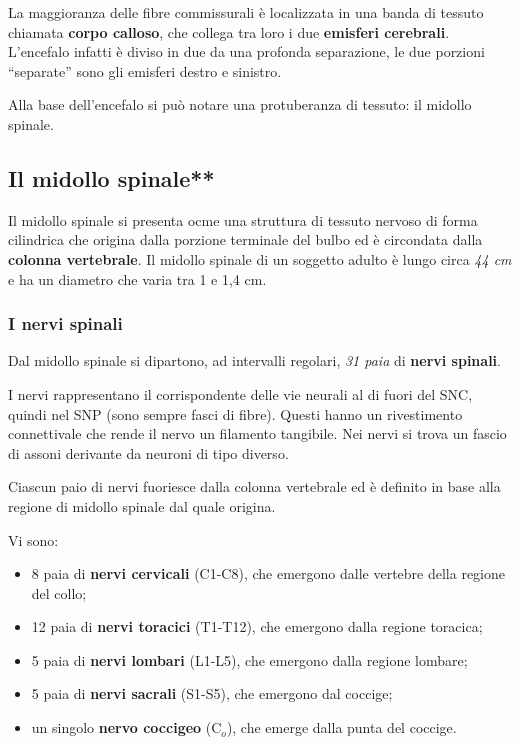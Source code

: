 \documentclass[]{article}
\begin{document}
La maggioranza delle fibre commissurali è localizzata in una banda di
tessuto chiamata \textbf{corpo calloso}, che collega tra loro i due
\textbf{emisferi cerebrali}. L'encefalo infatti è diviso in due da una
profonda separazione, le due porzioni ``separate'' sono gli emisferi
destro e sinistro.

Alla base dell'encefalo si può notare una protuberanza di tessuto: il
midollo spinale.

\subsection{Il midollo spinale**}\label{il-midollo-spinale}

Il midollo spinale si presenta ocme una struttura di tessuto nervoso di
forma cilindrica che origina dalla porzione terminale del bulbo ed è
circondata dalla \textbf{colonna vertebrale}. Il midollo spinale di un
soggetto adulto è lungo circa \emph{44 cm} e ha un diametro che varia
tra 1 e 1,4 cm.

\subsubsection{I nervi spinali}\label{i-nervi-spinali}

Dal midollo spinale si dipartono, ad intervalli regolari, \emph{31 paia}
di \textbf{nervi spinali}.

I nervi rappresentano il corrispondente delle vie neurali al di fuori
del SNC, quindi nel SNP (sono sempre fasci di fibre). Questi hanno un
rivestimento connettivale che rende il nervo un filamento tangibile. Nei
nervi si trova un fascio di assoni derivante da neuroni di tipo diverso.

Ciascun paio di nervi fuoriesce dalla colonna vertebrale ed è definito
in base alla regione di midollo spinale dal quale origina.

Vi sono:

\begin{itemize}
\itemsep1pt\parskip0pt
\item
  8 paia di \textbf{nervi cervicali} (C1-C8), che emergono dalle
  vertebre della regione del collo;
\item
  12 paia di \textbf{nervi toracici} (T1-T12), che emergono dalla
  regione toracica;
\item
  5 paia di \textbf{nervi lombari} (L1-L5), che emergono dalla regione
  lombare;
\item
  5 paia di \textbf{nervi sacrali} (S1-S5), che emergono dal coccige;
\item
  un singolo \textbf{nervo coccigeo} (C\(_o\)), che emerge dalla punta
  del coccige.
\end{itemize}
\end{document}

